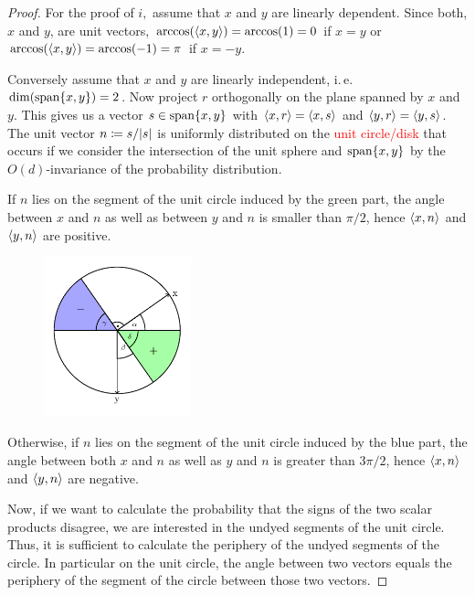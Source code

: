 	\begin{proof}
		For the proof of $i,$ assume that $x$ and $y$ are linearly dependent. Since both, $x$ and $y$, are unit vectors, $\arccos(\langle{x},{y}\rangle) = \arccos(1)=0$ if $x=y$ or $\arccos(\langle{x},{y}\rangle) = \arccos(-1) = \pi$ if $x=-y$.
		
		Conversely assume that $x$ and $y$ are linearly independent, i.\,e. $\operatorname{dim}(\operatorname{span}\{x,y\})=2$. Now project $r$ orthogonally on the plane spanned by $x$ and $y$. This gives us a vector $s\in \operatorname{span}\{x,y\}$ with $\langle{x},{r}\rangle = \langle{x},{s}\rangle$ and $\langle{y},{r}\rangle = \langle{y},{s}\rangle$. The unit vector $n\coloneqq s/{\left|{s}\right|}$ is uniformly distributed on the \textcolor{red}{unit circle/disk} that occurs if we consider the intersection of the unit sphere and $\operatorname{span}\{x,y\}$ by the $O(d)$-invariance of the probability distribution. \\
		
		\noindent\begin{minipage}{\textwidth}	
			If $n$ lies on the segment of the unit circle induced by the green part, the angle between $x$ and $n$ as well as between $y$ and $n$ is smaller than $\pi/2$, hence $\langle{x},{n}\rangle$ and $\langle{y},{n}\rangle$ are positive. 
			\begin{figure}
				\vspace{-20pt}
				\begin{center}
					\includegraphics[width=0.38\textwidth]{chapters/fig_unit_circle.pdf}
				\end{center}
				\vspace{-20pt}
			\end{figure}
			Otherwise, if $n$ lies on the segment of the unit circle induced by the blue part, the angle between both $x$ and $n$ as well as $y$ and $n$ is greater than $3\pi/2$, hence $\langle{x},{n}\rangle$ and $\langle{y},{n}\rangle$ are negative.
			
			\hspace{12pt} Now, if we want to calculate the probability that the signs of the two scalar products disagree, we are interested in the undyed segments of the unit circle. Thus, it is sufficient to calculate the periphery of the undyed segments of the circle. In particular on the unit circle, the angle between two vectors equals the periphery of the segment of the circle between those two vectors. 
				

\end{minipage}
\end{proof}
